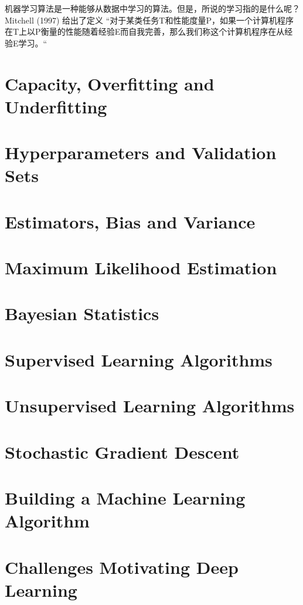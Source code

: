 机器学习算法是一种能够从数据中学习的算法。但是，所说的学习指的是什么呢？Mitchell (1997) 给出了定义 “对于某类任务T和性能度量P，如果一个计算机程序在T上以P衡量的性能随着经验E而自我完善，那么我们称这个计算机程序在从经验E学习。“

\section{Capacity, Overfitting and Underfitting}

\section{Hyperparameters and Validation Sets}

\section{Estimators, Bias and Variance}

\section{Maximum Likelihood Estimation}

\section{Bayesian Statistics}

\section{Supervised Learning Algorithms}

\section{Unsupervised Learning Algorithms}

\section{Stochastic Gradient Descent}

\section{Building a Machine Learning Algorithm}

\section{Challenges Motivating Deep Learning}
